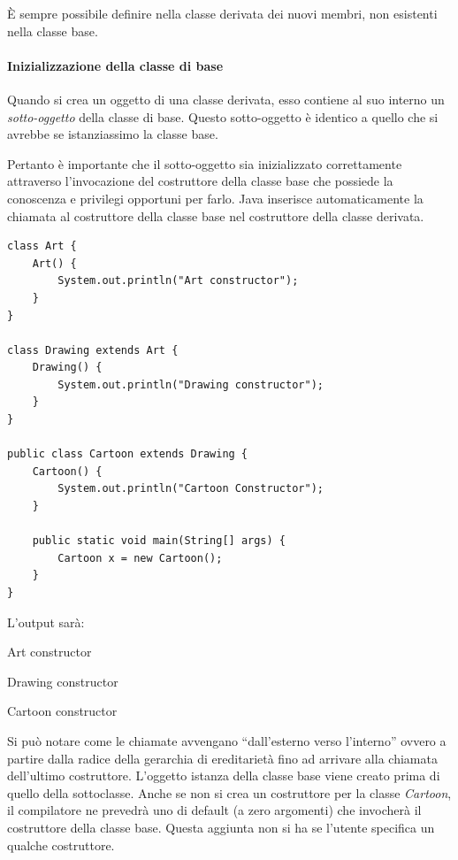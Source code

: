\documentclass[12pt]{report}
\begin{document}
È sempre possibile definire nella classe derivata dei nuovi membri, non esistenti nella classe base.
\paragraph{Inizializzazione della classe di base} Quando si crea un oggetto di una classe derivata, esso contiene al suo interno un \textit{sotto-oggetto} della classe di base. Questo sotto-oggetto è identico a quello che si avrebbe se istanziassimo la classe base.

Pertanto è importante che il sotto-oggetto sia inizializzato correttamente attraverso l'invocazione del costruttore della classe base che possiede la conoscenza e privilegi opportuni per farlo. Java inserisce automaticamente la chiamata al costruttore della classe base nel costruttore della classe derivata.
\begin{example}{}{}
\begin{lstlisting}[style=javastyle]
class Art {
	Art() {
		System.out.println("Art constructor");
	}
}

class Drawing extends Art {
	Drawing() {
		System.out.println("Drawing constructor");
	}
}

public class Cartoon extends Drawing {
	Cartoon() {
		System.out.println("Cartoon Constructor");
	}

	public static void main(String[] args) {
		Cartoon x = new Cartoon();
	}
}
\end{lstlisting}
L'output sarà:
\begin{center}
Art constructor

Drawing constructor

Cartoon constructor
\end{center}
\end{example}
Si può notare come le chiamate avvengano ``dall'esterno verso l'interno'' ovvero a partire dalla radice della gerarchia di ereditarietà fino ad arrivare alla chiamata dell'ultimo costruttore. L'oggetto istanza della classe base viene creato prima di quello della sottoclasse. Anche se non si crea un costruttore per la classe \textit{Cartoon}, il compilatore ne prevedrà uno di default (a zero argomenti) che invocherà il costruttore della classe base. Questa aggiunta non si ha se l'utente specifica un qualche costruttore.
\end{document}
